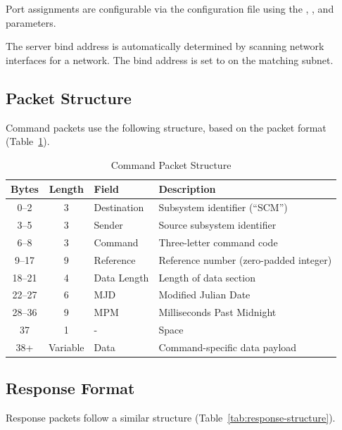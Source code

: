 Port assignments are configurable via the  configuration file using the , , and  parameters.

The server bind address is automatically determined by scanning network interfaces for a  network. The bind address is set to  on the matching subnet.

\subsection{Packet Structure}

Command packets use the following structure, based on the \MCS{} packet format (Table~\ref{tab:packet-structure}).

\begin{table}[htbp]
    \centering
    \caption{Command Packet Structure}
    \label{tab:packet-structure}
    \begin{tabular}{cclp{5.5cm}}
        \toprule
        \textbf{Bytes} & \textbf{Length} & \textbf{Field} & \textbf{Description} \\
        \midrule
        0--2 & 3 & Destination & Subsystem identifier (``SCM'') \\
        3--5 & 3 & Sender & Source subsystem identifier \\
        6--8 & 3 & Command & Three-letter command code \\
        9--17 & 9 & Reference & Reference number (zero-padded integer) \\
        18--21 & 4 & Data Length & Length of data section \\
        22--27 & 6 & MJD & Modified Julian Date \\
        28--36 & 9 & MPM & Milliseconds Past Midnight \\
        37 & 1 & - & Space \\
        38+ & Variable & Data & Command-specific data payload \\
        \bottomrule
    \end{tabular}
\end{table}

\subsection{Response Format}

Response packets follow a similar structure (Table~\ref{tab:response-structure}).

